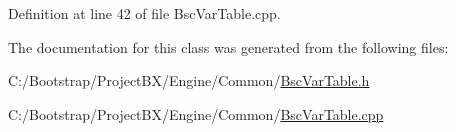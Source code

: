 Definition at line 42 of file BscVarTable.cpp.

The documentation for this class was generated from the following files:\begin{CompactItemize}
\item 
C:/Bootstrap/ProjectBX/Engine/Common/\hyperlink{_bsc_var_table_8h}{BscVarTable.h}\item 
C:/Bootstrap/ProjectBX/Engine/Common/\hyperlink{_bsc_var_table_8cpp}{BscVarTable.cpp}\end{CompactItemize}
